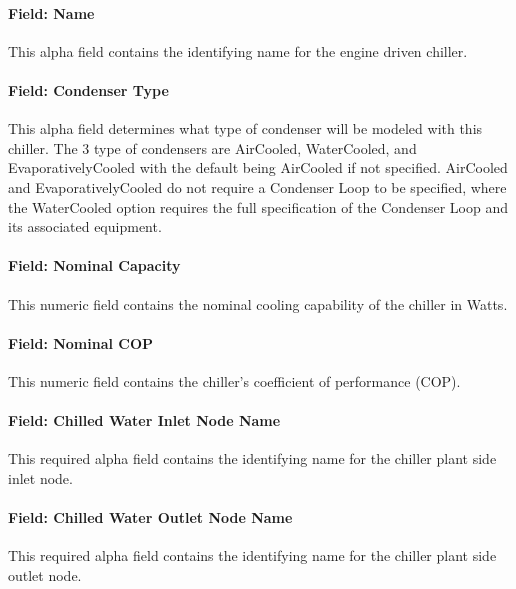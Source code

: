 \paragraph{Field: Name}\label{field-name-5-017}

This alpha field contains the identifying name for the engine driven chiller.

\paragraph{Field: Condenser Type}\label{field-condenser-type-3-000}

This alpha field determines what type of condenser will be modeled with this chiller. The 3 type of condensers are AirCooled, WaterCooled, and EvaporativelyCooled with the default being AirCooled if not specified. AirCooled and EvaporativelyCooled do not require a Condenser Loop to be specified, where the WaterCooled option requires the full specification of the Condenser Loop and its associated equipment.

\paragraph{Field: Nominal Capacity}\label{field-nominal-capacity-4}

This numeric field contains the nominal cooling capability of the chiller in Watts.

\paragraph{Field: Nominal COP}\label{field-nominal-cop-2}

This numeric field contains the chiller's coefficient of performance (COP).

\paragraph{Field: Chilled Water Inlet Node Name}\label{field-chilled-water-inlet-node-name-5}

This required alpha field contains the identifying name for the chiller plant side inlet node.

\paragraph{Field: Chilled Water Outlet Node Name}\label{field-chilled-water-outlet-node-name-5}

This required alpha field contains the identifying name for the chiller plant side outlet node.

